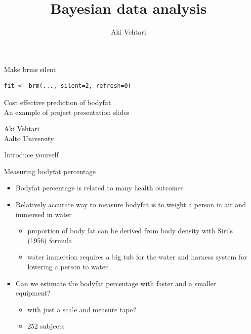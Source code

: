 \documentclass[english,t]{beamer}
\title[]{Bayesian data analysis}
\subtitle{}
\author[Aki.Vehtari@aalto.fi -- bayes.club/@avehtari]{Aki Vehtari}
\institute[Aalto]{}
\date[]{}
\begin{document}
\begin{frame}[fragile]{Make brms silent}

\begin{verbatim}
fit <- brm(..., silent=2, refresh=0)
\end{verbatim}
  
\end{frame}

\begin{frame}

  \centering

  \vspace{2\baselineskip}

  \LARGE{\color{navyblue} Cost effective prediction of bodyfat}\\
      \large{\color{gray} An example of project presentation slides}


    \baselineskip

    \Large{Aki Vehtari}\\
    \large{Aalto University}

    \baselineskip

    \pause
    Introduce yourself

  
\end{frame}

\begin{frame}
  
  {\Large\color{navyblue} Measuring bodyfat percentage}


  \begin{itemize}
  \item Bodyfat percentage is related to many health outcomes
  \item<2-> Relatively accurate way to measure bodyfat is to weight a
    person in air and immersed in water
    \begin{itemize}
    \item proportion of body fat can be derived from body density with
      Siri's (1956) formula
    \item water immersion requires a big tub for the water and harness
      system for lowering a person to water
    \end{itemize}
  \item<3-> Can we estimate the bodyfat percentage with faster and a
    smaller equipment?
    \begin{itemize}
    \item with just a scale and measure tape?
    \item 252 subjects
    \end{itemize}
  \end{itemize}
  \vspace{2\baselineskip}
  
\end{frame}
\end{document}
